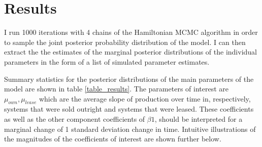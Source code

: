 \documentclass[12pt]{article}
\begin{document}
\section{Results}

I run 1000 iterations with 4 chains of the Hamiltonian MCMC algorithm in order to sample the joint posterior probability distribution of the model. I can then extract the the estimates of the marginal posterior distributions of the individual parameters in the form of a list of simulated parameter estimates.

Summary statistics for the posterior distributions of the main parameters of the model are shown in table \ref{table_results}. The parameters of interest are $\mu_{own}, \mu_{lease}$ which are the average slope of production over time in, respectively, systems that were sold outright and systems that were leased. These coefficients as well as the other component coefficients of $\beta1$, should be interpreted for a marginal change of 1 standard deviation change in time. Intuitive illustrations of the magnitudes of the coefficients of interest are shown further below.
\end{document}
